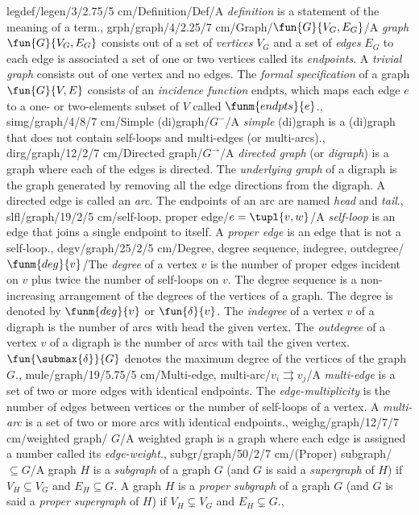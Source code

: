 legdef/legen/3/2.75/5 cm/Definition/Def/{A \emph{definition} is a statement of the meaning of a term.},%
grph/graph/4/2.25/7 cm/Graph/{$\fun{G}{V_G,E_G}$}/{A \emph{graph} $\fun{G}{V_G,E_G}$ consists out of a set of \emph{vertices} $V_G$ and a set of \emph{edges} $E_G$ to each edge is associated a set of one or two vertices called its \emph{endpoints}. A \emph{trivial graph} consists out of one vertex and no edges. The \emph{formal specification} of a graph $\fun{G}{V,E}$ consists of an \emph{incidence function} $\mbox{endpts}$, which maps each edge $e$ to a one- or two-elements subset of $V$ called $\funm{endpts}{e}$.},
simg/graph/4/8/7 cm/{Simple (di)graph}/$G^{-}$/{A \emph{simple} (di)graph is a (di)graph that does not contain self-loops and multi-edges (or multi-arcs).},
dirg/graph/12/2/7 cm/{Directed graph}/$G^{\rightarrow}$/{A \emph{directed graph} (or \emph{digraph}) is a graph where each of the edges is directed. The \emph{underlying graph} of a digraph is the graph generated by removing all the edge directions from the digraph. A directed edge is called an \emph{arc}. The endpoints of an arc are named \emph{head} and \emph{tail}.},
slfl/graph/19/2/5 cm/{self-loop, proper edge}/{$e=\tupl{v,w}$}/{A \emph{self-loop} is an edge that joins a single endpoint to itself. A \emph{proper edge} is an edge that is not a self-loop.},
degv/graph/25/2/5 cm/{Degree, degree sequence, indegree, outdegree}/{$\funm{deg}{v}$}/{The \emph{degree} of a vertex $v$ is the number of proper edges incident on $v$ plus twice the number of self-loops on $v$. The degree sequence is a non-increasing arrangement of the degrees of the vertices of a graph. The degree is denoted by $\funm{deg}{v}$ or $\fun{\delta}{v}$. The \emph{indegree} of a vertex $v$ of a digraph is the number of arcs with head the given vertex. The \emph{outdegree} of a vertex $v$ of a digraph is the number of arcs with tail the given vertex. $\fun{\submax{\delta}}{G}$ denotes the maximum degree of the vertices of the graph $G$.},
mule/graph/19/5.75/5 cm/{Multi-edge, multi-arc}/$v_i\rightrightarrows v_j$/{A \emph{multi-edge} is a set of two or more edges with identical endpoints. The \emph{edge-multiplicity} is the number of edges between vertices or the number of self-loops of a vertex. A \emph{multi-arc} is a set of two or more arcs with identical endpoints.},
weighg/graph/12/7/7 cm/{weighted graph}/{\textlinb{\BPtalent} $G$}/{A weighted graph is a graph where each edge is assigned a number called its \emph{edge-weight}.},
subgr/graph/50/2/7 cm/{(Proper) subgraph}/{$\subseteq G$}/{A graph $H$ is a \emph{subgraph} of a graph $G$ (and $G$ is said a \emph{supergraph} of $H$) if $V_H\subseteq V_G$ and $E_H\subseteq G$. A graph $H$ is a \emph{proper subgraph} of a graph $G$ (and $G$ is said a \emph{proper supergraph} of $H$) if $V_H\subsetneq V_G$ and $E_H\subsetneq G$.},
